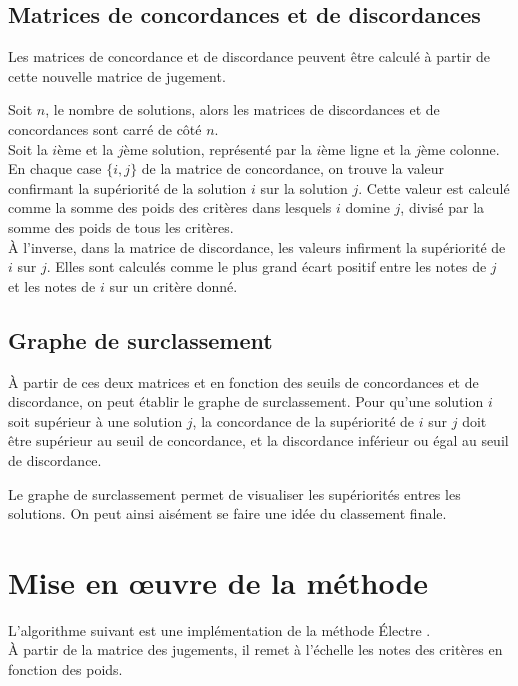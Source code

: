 \subsection{Matrices de concordances et de discordances}
Les matrices de concordance et de discordance peuvent être calculé à partir de cette nouvelle matrice de jugement.

Soit $n$, le nombre de solutions, alors les matrices de discordances et de concordances sont carré de côté $n$.\\

Soit la $i$ème et la $j$ème solution, représenté par la $i$ème ligne et la $j$ème colonne.\\
En chaque case $\{i,j\}$ de la matrice de concordance, on trouve la valeur confirmant la supériorité de la solution $i$ sur la solution $j$. Cette valeur est calculé comme la somme des poids des critères dans lesquels $i$ domine $j$, divisé par la somme des poids de tous les critères.\\
À l'inverse, dans la matrice de discordance, les valeurs infirment la supériorité de $i$ sur $j$. Elles sont calculés comme le plus grand écart positif entre les notes de $j$ et les notes de $i$ sur un critère donné.\\

\subsection{Graphe de surclassement}

À partir de ces deux matrices et en fonction des seuils de concordances et de discordance, on peut établir le graphe de surclassement.
Pour qu'une solution $i$ soit supérieur à une solution $j$, la concordance de la supériorité de $i$ sur $j$ doit être supérieur au seuil de concordance, et la discordance inférieur ou égal au seuil de discordance.

Le graphe de surclassement permet de visualiser les supériorités entres les solutions.
On peut ainsi aisément se faire une idée du classement finale.

\section{Mise en œuvre de la méthode}
L'algorithme suivant est une implémentation de la méthode Électre .\\
À partir de la matrice des jugements, il remet à l'échelle les notes des critères en fonction des poids.

